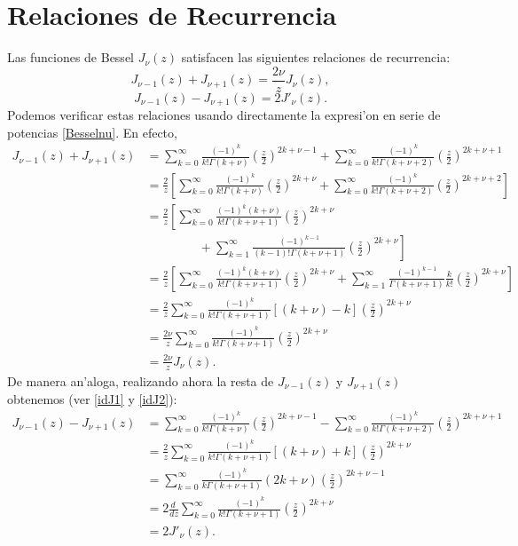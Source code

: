 \section{Relaciones de Recurrencia}
Las funciones de Bessel $J_\nu(z)$ satisfacen las siguientes relaciones de recurrencia:
\begin{equation}\label{rrJnu1}
J_{\nu-1}(z)+J_{\nu+1}(z)=\frac{2\nu}{z}J_\nu(z),
\end{equation}
\begin{equation}\label{rrJnu2}
J_{\nu-1}(z)-J_{\nu+1}(z)=2J'_\nu(z).
\end{equation}
Podemos verificar estas relaciones usando directamente la expresi'on en serie de potencias \eqref{Besselnu}. En efecto,
\begin{align}
J_{\nu-1}(z)+J_{\nu+1}(z) &= 
\sum_{k=0}^\infty\frac{(-1)^k}{k!\Gamma(k+\nu)}\left(\frac{z}{2}\right)^{2k+\nu-1} 
+\sum_{k=0}^\infty\frac{(-1)^k}{k!\Gamma(k+\nu+2)}\left(\frac{z}{2}\right)^{2k+\nu+1} \label{idJ1}\\
&= \frac{2}{z}\left[\sum_{k=0}^\infty\frac{(-1)^k}{k!\Gamma(k+\nu)}\left(\frac{z}{2}\right)^{2k+\nu} 
+\sum_{k=0}^\infty\frac{(-1)^k}{k!\Gamma(k+\nu+2)}\left(\frac{z}{2}\right)^{2k+\nu+2}\right] \\
&= \frac{2}{z}\left[\sum_{k=0}^\infty\frac{(-1)^k(k+\nu)}{k!\Gamma(k+\nu+1)}\left(\frac{z}{2}\right)^{2k+\nu} \right. \nonumber\\
&\ \left.\qquad\qquad +\sum_{k=1}^\infty\frac{(-1)^{k-1}}{(k-1)!\Gamma(k+\nu+1)}\left(\frac{z}{2}\right)^{2k+\nu}\right] \\
&= \frac{2}{z}\left[\sum_{k=0}^\infty\frac{(-1)^k(k+\nu)}{k!\Gamma(k+\nu+1)}\left(\frac{z}{2}\right)^{2k+\nu}  +\sum_{k=1}^\infty\frac{(-1)^{k-1}}{\Gamma(k+\nu+1)}\frac{k}{k!}\left(\frac{z}{2}\right)^{2k+\nu}\right] \\
&= \frac{2}{z}\sum_{k=0}^\infty\frac{(-1)^k}{k!\Gamma(k+\nu+1)}\left[(k+\nu)-k\right]\left(\frac{z}{2}\right)^{2k+\nu} \label{idJ2}\\
&= \frac{2\nu}{z}\sum_{k=0}^\infty\frac{(-1)^k}{k!\Gamma(k+\nu+1)}\left(\frac{z}{2}\right)^{2k+\nu} \\
&= \frac{2\nu}{z}J_\nu(z).
\end{align}
De manera an'aloga, realizando ahora la resta de $J_{\nu-1}(z)$ y $J_{\nu+1}(z)$ obtenemos (ver \eqref{idJ1} y \eqref{idJ2}):
\begin{align}
J_{\nu-1}(z)-J_{\nu+1}(z) &= 
\sum_{k=0}^\infty\frac{(-1)^k}{k!\Gamma(k+\nu)}\left(\frac{z}{2}\right)^{2k+\nu-1} 
-\sum_{k=0}^\infty\frac{(-1)^k}{k!\Gamma(k+\nu+2)}\left(\frac{z}{2}\right)^{2k+\nu+1} \\
&= \frac{2}{z}\sum_{k=0}^\infty\frac{(-1)^k}{k!\Gamma(k+\nu+1)}\left[(k+\nu)+k\right]\left(\frac{z}{2}\right)^{2k+\nu}\\
&= \sum_{k=0}^\infty\frac{(-1)^k}{k\Gamma(k+\nu+1)}(2k+\nu)\left(\frac{z}{2}\right)^{2k+\nu-1}\\
&= 2\frac{d\ }{dz}\sum_{k=0}^\infty\frac{(-1)^k}{k!\Gamma(k+\nu+1)}\left(\frac{z}{2}\right)^{2k+\nu} \\
&= 2J'_\nu(z).
\end{align}
